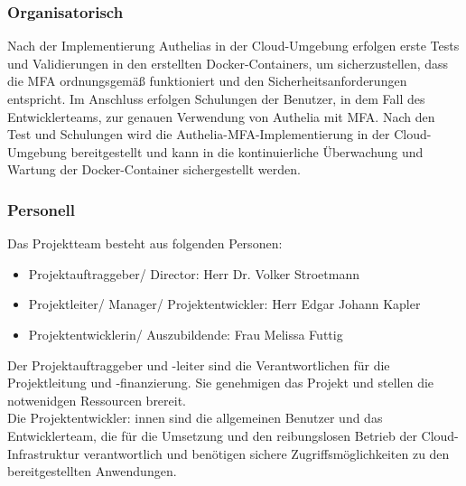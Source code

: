 \subsubsection{Organisatorisch}
\label{sec:Organisatorisch}
Nach der Implementierung Authelias in der Cloud-Umgebung erfolgen erste Tests und Validierungen in den erstellten Docker-Containers, um sicherzustellen, dass die MFA ordnungsgemäß funktioniert und den Sicherheitsanforderungen entspricht. Im Anschluss erfolgen Schulungen der Benutzer, in dem Fall des Entwicklerteams, zur genauen Verwendung von Authelia mit MFA. Nach den Test und Schulungen wird die Authelia-MFA-Implementierung in der Cloud-Umgebung bereitgestellt und kann in die kontinuierliche Überwachung und Wartung der Docker-Container sichergestellt werden.

\subsubsection{Personell}
\label{sec:Personell}
Das Projektteam besteht aus folgenden Personen:
\begin{itemize}
	\item Projektauftraggeber/ Director: Herr Dr. Volker Stroetmann
	\item Projektleiter/ Manager/ Projektentwickler: Herr Edgar Johann Kapler
	\item Projektentwicklerin/ Auszubildende: Frau Melissa Futtig
\end{itemize}
Der Projektauftraggeber und -leiter sind die Verantwortlichen für die 
Projektleitung und -finanzierung. Sie genehmigen das Projekt und stellen 
die notwenidgen Ressourcen brereit.
\\Die Projektentwickler: innen sind die allgemeinen Benutzer und das Entwicklerteam, die 
für die Umsetzung und den reibungslosen Betrieb der Cloud-Infrastruktur verantwortlich 
und benötigen sichere Zugriffsmöglichkeiten zu den bereitgestellten Anwendungen.